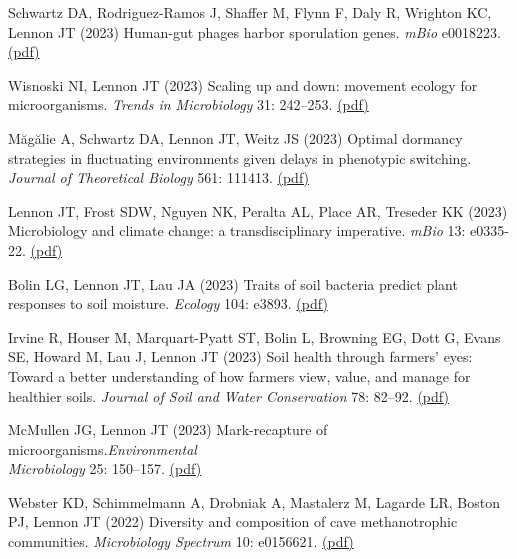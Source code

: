 \documentclass[11pt]{article}
\begin{document}
\begin{etaremune}
\item Schwartz DA, Rodriguez-Ramos J, Shaffer M, Flynn F, Daly R, Wrighton KC, Lennon JT (2023) Human-gut phages harbor sporulation genes. \textit{mBio} e0018223. \href{https://lennonlab.github.io/assets/publications/Schwartz_etal_2023a.pdf}{(pdf)}

\item Wisnoski NI, Lennon JT (2023) Scaling up and down: movement ecology for microorganisms. \textit{Trends in Microbiology} 31: 242–253. \href{https://lennonlab.github.io/assets/publications/Wisnoski_Lennon_2023.pdf}{(pdf)}

\item Măgălie A, Schwartz DA, Lennon JT, Weitz JS (2023) Optimal dormancy strategies in fluctuating environments given delays in phenotypic switching. \textit{Journal of Theoretical Biology} 561: 111413. \href{https://lennonlab.github.io/assets/publications/Magalie_etal_2023.pdf}{(pdf)}

\item Lennon JT, Frost SDW, Nguyen NK, Peralta AL, Place AR, Treseder KK (2023) Microbiology and climate change: a transdisciplinary imperative. \textit{mBio} 13: e0335-22. \href{https://lennonlab.github.io/assets/publications/Lennon_etal_2023.pdf}{(pdf)}

\item Bolin LG, Lennon JT, Lau JA (2023) Traits of soil bacteria predict plant responses to soil moisture. \textit{Ecology} 104: e3893. \href{https://lennonlab.github.io/assets/publications/Bolin_etal_2023.pdf}{(pdf)}

\item Irvine R, Houser M, Marquart-Pyatt ST, Bolin L, Browning EG, Dott G, Evans SE, Howard M, Lau J, Lennon JT (2023) Soil health through farmers’ eyes: Toward a better understanding of how farmers view, value, and manage for healthier soils. \textit{Journal of Soil and Water Conservation} 78: 82–92. \href{https://lennonlab.github.io/assets/publications/Irvine_etal_2023.pdf}{(pdf)}

\item McMullen JG, Lennon JT (2023) Mark-recapture of microorganisms.\textit{Environmental \\ Microbiology} 25: 150–157. \href{https://lennonlab.github.io/assets/publications/McMullen_Lennon_2023.pdf}{(pdf)}

\item Webster KD, Schimmelmann A, Drobniak A, Mastalerz M, Lagarde LR, Boston PJ, Lennon JT (2022) Diversity and composition of cave methanotrophic communities. \textit{Microbiology Spectrum} 10: e0156621. \href{https://lennonlab.github.io/assets/publications/Webster_etal_2022.pdf}{(pdf)}


\end{etaremune}
\end{document}
